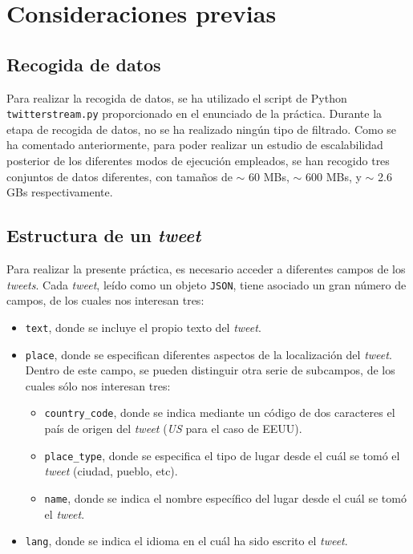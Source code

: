 \documentclass[10pt, spanish]{article}
\begin{document}
\section{Consideraciones previas}

\subsection{Recogida de datos}

Para realizar la recogida de datos, se ha utilizado el script de Python \texttt{twitterstream.py} proporcionado en el enunciado de la práctica. Durante la etapa de recogida de datos, no se ha realizado ningún tipo de filtrado. Como se ha comentado anteriormente, para poder realizar un estudio de escalabilidad posterior de los diferentes modos de ejecución empleados, se han recogido tres conjuntos de datos diferentes, con tamaños de $\sim$ 60 MBs, $\sim$ 600 MBs, y $\sim$ 2.6 GBs respectivamente.

\subsection{Estructura de un \textit{tweet}}

Para realizar la presente práctica, es necesario acceder a diferentes campos de los \textit{tweets}. Cada \textit{tweet}, leído como un objeto \texttt{JSON}, tiene asociado un gran número de campos, de los cuales nos interesan tres: 

\begin{itemize}
\item \texttt{text}, donde se incluye el propio texto del \textit{tweet}.
\item \texttt{place}, donde se especifican diferentes aspectos de la localización del \textit{tweet}. Dentro de este campo, se pueden distinguir otra serie de subcampos, de los cuales sólo nos interesan tres:
\begin{itemize}
\item \texttt{country\_code}, donde se indica mediante un código de dos caracteres el país de origen del \textit{tweet} (\textit{US} para el caso de EEUU).
\item \texttt{place\_type}, donde se especifica el tipo de lugar desde el cuál se tomó el \textit{tweet} (ciudad, pueblo, etc).
\item \texttt{name}, donde se indica el nombre específico del lugar desde el cuál se tomó el \textit{tweet}.
\end{itemize}
\item \texttt{lang}, donde se indica el idioma en el cuál ha sido escrito el \textit{tweet}.
\end{itemize}
\end{document}
